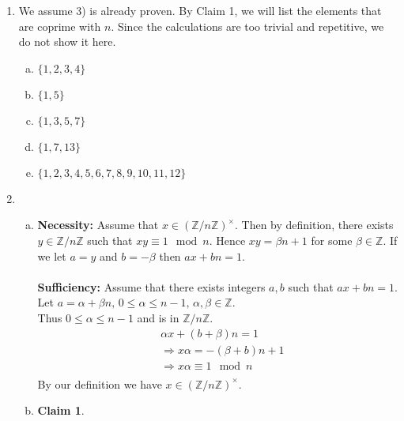 \documentclass[A4paper,12pt]{article}
\theoremstyle{definition}
\newtheorem{claim}{Claim}
\numberwithin{equation}{section}
\begin{document}
\begin{enumerate}[1)]
\begin{enumerate}[(a)]
        \end{enumerate}
    \item 
        We assume 3) is already proven. By Claim 1, we will list the elements that are coprime with $n$. Since the calculations are too trivial and repetitive, we do not show it here.
        \begin{enumerate}[(a)]
            \item
                $
                \{1, 2, 3, 4\}
                $
            \item
                $ 
                \{1, 5\}
                $
            \item 
                $ 
                \{1, 3, 5, 7\}
                $
            \item 
                $ 
                \{1, 7, 13\}
                $
            \item 
                $ 
                \{1,2,3,4,5,6,7,8,9,10,11,12\}
                $
        \end{enumerate}
    \item 
        \begin{enumerate}[(a)]
            \item
                \textbf{Necessity:}
                Assume that $x \in (\mathbb{Z}/n\mathbb{Z})^\times$. Then by definition, there exists $y \in \mathbb{Z}/n\mathbb{Z}$ such that $xy \equiv 1 \mod{n}$. Hence $xy = \beta n+1$ for some $\beta \in \mathbb{Z}$. If we let $a = y$ and $b = -\beta$ then $ax+bn=1$.\\\\
                \textbf{Sufficiency:}
                Assume that there exists integers $a, b$ such that $ax+bn = 1$. Let $a = \alpha + \beta n,\, 0 \leq \alpha \leq n-1,\, \alpha,\beta \in \mathbb{Z}$.\\
                Thus $0 \le \alpha \le n-1$ and is in $\mathbb{Z}/n\mathbb{Z}$.
                \begin{align*}
                    &\alpha x + (b+\beta)n = 1\\
                    &\Rightarrow
                    x\alpha = -(\beta+b)n + 1\\
                    &\Rightarrow
                    x\alpha \equiv 1 \mod{n}\\
                \end{align*}
                By our definition we have $x \in (\mathbb{Z}/n\mathbb{Z})^\times$.
            \item
                \begin{claim}

\end{claim}
\end{enumerate}
\end{enumerate}
\end{document}

